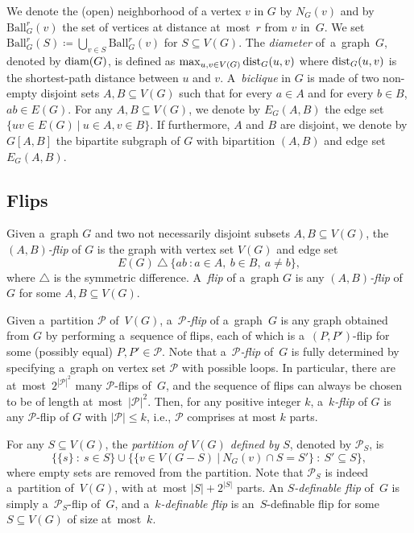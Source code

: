 \documentclass[a4paper,UKenglish,cleveref, autoref, thm-restate]{lipics-v2021}
\renewcommand{\cal}{\mathcal}
\renewcommand{\subset}{\subseteq}
\newcommand{\dist}{\textnormal{dist}}
\newcommand{\diam}{\textnormal{diam}}
\renewcommand{\le}{\leqslant}
\renewcommand{\leq}{\le}
\newcommand{\Ball}{\mathrm{Ball}}
\begin{document}
We denote the (open) neighborhood of a vertex $v$ in $G$ by $N_G(v)$ and by $\Ball_G^r(v)$ the set of vertices at distance at~most~$r$ from $v$ in~$G$. We set $\Ball_G^r(S) \coloneqq \bigcup_{v \in S} \Ball_G^r(v)$ for $S \subseteq V(G)$.
The \emph{diameter} of~a~graph~$G$, denoted by $\diam(G)$, is defined as $\max_{u, v \in V(G)} \dist_G(u,v)$ where $\dist_G(u,v)$ is the shortest-path distance between $u$ and $v$.
A~\emph{biclique} in $G$ is made of two non-empty disjoint sets $A, B \subset V(G)$ such that for every $a \in A$ and for every $b \in B$, $ab \in E(G)$.
For any $A, B \subset V(G)$, we denote by $E_G(A,B)$ the edge set $\{uv \in E(G)~|~u\in A, v\in B\}$.
If furthermore, $A$ and $B$ are disjoint, we denote by $G[A,B]$ the bipartite subgraph of $G$ with bipartition $(A,B)$ and edge set $E_G(A,B)$.

\subsection{Flips}\label{sec:flip-def}

Given a~graph $G$ and two not necessarily disjoint subsets $A, B \subseteq V(G)$, the \emph{$(A,B)$-flip} of $G$ is the graph with vertex set $V(G)$ and edge set \[E(G)\ \triangle\  \{ab~: a \in A,\ b \in B,\ a \neq b\},\]
where $\triangle$ is the symmetric difference.
A~\emph{flip} of a~graph $G$ is any \emph{$(A,B)$-flip} of $G$ for some $A, B \subseteq V(G)$.

Given a~partition $\cal P$ of~$V(G)$, a~\emph{$\cal P$-flip} of a~graph~$G$ is any graph obtained from $G$ by performing a~sequence of flips, each of which is a~$(P,P')$-flip for some (possibly equal) $P, P' \in \cal P$.
Note that a~\emph{$\cal P$-flip} of~$G$ is fully determined by specifying a~graph on vertex set $\cal P$ with possible loops.
In particular, there are at~most~$2^{|\cal P|^2}$ many $\cal P$-flips of~$G$, and the sequence of flips can always be chosen to be of length at~most~$|\cal P|^2$.
Then, for any positive integer $k$, a~\emph{$k$-flip} of $G$ is any $\cal P$-flip of $G$ with $|\cal P|\leq k$, i.e., $\cal P$ comprises at most $k$ parts.

For any $S \subseteq V(G)$, the \emph{partition of $V(G)$ defined by $S$}, denoted by $\cal P_S$, is \[\{\{s\}~\colon~s \in S\} \cup \{\{v \in V(G-S)~|~N_G(v) \cap S=S'\}~\colon~S' \subseteq S\},\]
where empty sets are removed from the partition.
Note that $\cal P_S$ is indeed a~partition of~$V(G)$, with at~most $|S|+2^{|S|}$ parts.
An \emph{$S$-definable flip} of~$G$ is simply a~$\cal P_S$-flip of~$G$, and a~\emph{$k$-definable flip} is an~$S$-definable flip for some $S \subseteq V(G)$ of size at~most~$k$.
\end{document}
